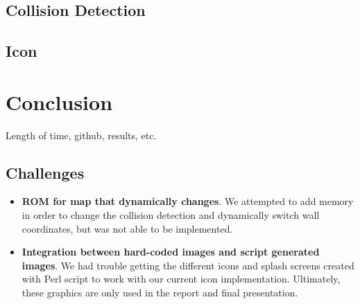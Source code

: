 \documentclass[11pt]{article}
\begin{document}
		\subsection{Collision Detection}		
		
				
		\subsection{Icon}
		



		
		

		
	


\section{Conclusion}
Length of time, github, results, etc.

	\subsection{Challenges}
		
		\begin{itemize}				
	
		\item \textbf{ROM for map that dynamically changes}. We attempted to add memory in order to change the collision detection and dynamically switch wall coordinates, but was not able to be implemented.
		
		\item \textbf{Integration between hard-coded images and script generated images}.  We had trouble getting the different icons and splash screens created with Perl script to work with our current icon implementation.  Ultimately, these graphics are only used in the report and final presentation.
				
		\end{itemize}
\end{document}
